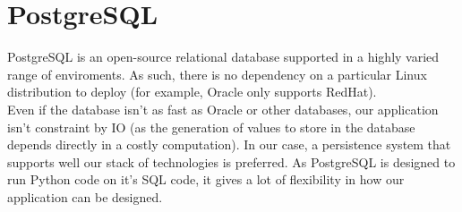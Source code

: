\section{PostgreSQL}

PostgreSQL\cite{postgres} is an open-source relational database supported in
a highly varied range of enviroments. As such, there is no dependency on a
particular Linux distribution to deploy (for example, Oracle only supports
RedHat).\\

Even if the database isn't as fast as Oracle or other databases, our
application isn't constraint by IO (as the generation of values to store in the
database depends directly in a costly computation). In our case, a persistence
system that supports well our stack of technologies is preferred. As
PostgreSQL is designed to run Python code on it's SQL code, it gives a lot
of flexibility in how our application can be designed.
